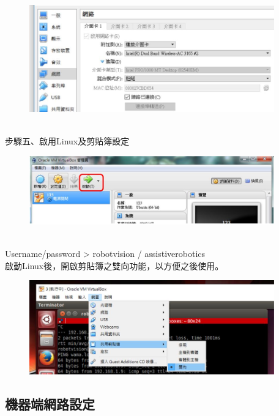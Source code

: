 \documentclass{article}
\begin{document}
\begin{figure}[htp]
    \begin{center}
        \includegraphics[width=300pt]{pic/圖片6.jpg}
    \end{center}
\end{figure}
\\步驟五、啟用Linux及剪貼簿設定
\begin{figure}[htp]
    \begin{center}
        \includegraphics[width=300pt]{pic/圖片7.jpg}
    \end{center}
\end{figure}
\\Username/password > robotvision / assistiverobotics
\\啟動Linux後，開啟剪貼簿之雙向功能，以方便之後使用。
\begin{figure}[htp]
    \begin{center}
        \includegraphics[width=300pt]{pic/圖片8.jpg}
    \end{center}
\end{figure}


\subsection{機器端網路設定}
\end{document}
